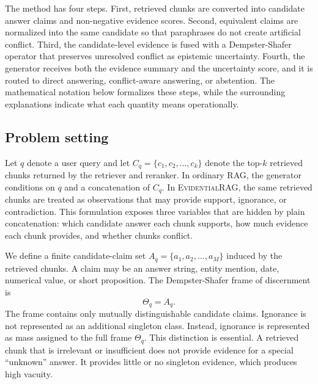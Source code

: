 \documentclass[preprint,12pt,authoryear,nopreprintline]{elsarticle}
\newcommand{\Frame}{\Theta}
\newcommand{\ERAG}{\textsc{EvidentialRAG}}
\begin{document}
The method has four steps. First, retrieved chunks are converted into candidate answer claims and non-negative evidence scores. Second, equivalent claims are normalized into the same candidate so that paraphrases do not create artificial conflict. Third, the candidate-level evidence is fused with a Dempster-Shafer operator that preserves unresolved conflict as epistemic uncertainty. Fourth, the generator receives both the evidence summary and the uncertainty score, and it is routed to direct answering, conflict-aware answering, or abstention. The mathematical notation below formalizes these steps, while the surrounding explanations indicate what each quantity means operationally.

\subsection{Problem setting}

Let $q$ denote a user query and let $C_q=\{c_1,c_2,\ldots,c_k\}$ denote the top-$k$ retrieved chunks returned by the retriever and reranker. In ordinary RAG, the generator conditions on $q$ and a concatenation of $C_q$. In \ERAG{}, the same retrieved chunks are treated as observations that may provide support, ignorance, or contradiction. This formulation exposes three variables that are hidden by plain concatenation: which candidate answer each chunk supports, how much evidence each chunk provides, and whether chunks conflict.

We define a finite candidate-claim set $A_q=\{a_1,a_2,\ldots,a_M\}$ induced by the retrieved chunks. A claim may be an answer string, entity mention, date, numerical value, or short proposition. The Dempster-Shafer frame of discernment is
\begin{equation}
    \Frame_q=A_q.
    \label{eq:frame}
\end{equation}
The frame contains only mutually distinguishable candidate claims. Ignorance is not represented as an additional singleton class. Instead, ignorance is represented as mass assigned to the full frame $\Frame_q$. This distinction is essential. A retrieved chunk that is irrelevant or insufficient does not provide evidence for a special ``unknown'' answer. It provides little or no singleton evidence, which produces high vacuity.
\end{document}
